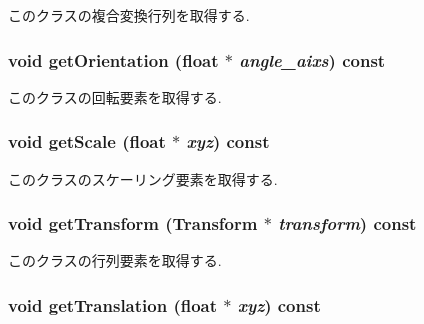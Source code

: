 このクラスの複合変換行列を取得する. \hypertarget{classm3g_1_1Transformable_06125ab0d85ef8c5c7ace9ced04993f3}{
\subsubsection[{getOrientation}]{\setlength{\rightskip}{0pt plus 5cm}void getOrientation (float $\ast$ {\em angle\_\-aixs}) const}}
\label{classm3g_1_1Transformable_06125ab0d85ef8c5c7ace9ced04993f3}


このクラスの回転要素を取得する. \hypertarget{classm3g_1_1Transformable_b8a2dd11d0ba90e138625eb86a6a6083}{
\subsubsection[{getScale}]{\setlength{\rightskip}{0pt plus 5cm}void getScale (float $\ast$ {\em xyz}) const}}
\label{classm3g_1_1Transformable_b8a2dd11d0ba90e138625eb86a6a6083}


このクラスのスケーリング要素を取得する. \hypertarget{classm3g_1_1Transformable_73f387f99c527b382c8aaa54b8af6ed6}{
\subsubsection[{getTransform}]{\setlength{\rightskip}{0pt plus 5cm}void getTransform ({\bf Transform} $\ast$ {\em transform}) const}}
\label{classm3g_1_1Transformable_73f387f99c527b382c8aaa54b8af6ed6}


このクラスの行列要素を取得する. \hypertarget{classm3g_1_1Transformable_d8aec42959fecc3d76f9539d3afa3c8d}{
\subsubsection[{getTranslation}]{\setlength{\rightskip}{0pt plus 5cm}void getTranslation (float $\ast$ {\em xyz}) const}}
\label{classm3g_1_1Transformable_d8aec42959fecc3d76f9539d3afa3c8d}


